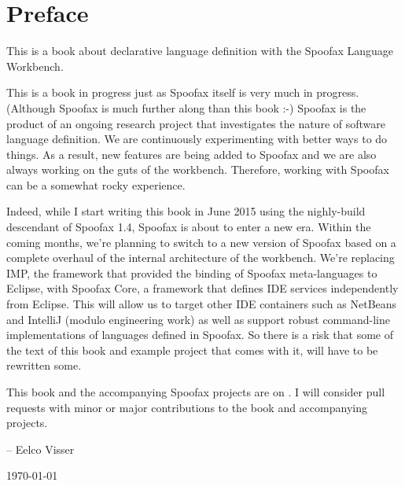\chapter*{Preface}

This is a book about declarative language definition with the Spoofax Language
Workbench.

This is a book in progress just as Spoofax itself is very much in progress.
(Although Spoofax is much further along than this book :-) Spoofax is the
product of an ongoing research project that investigates the nature of software
language definition. We are continuously experimenting with better ways to do
things.
As a result, new features are being added to Spoofax and we are also always
working on the guts of the workbench.
Therefore, working with Spoofax can be a somewhat rocky experience.

Indeed, while I start writing this book in June 2015 using the nighly-build
descendant of Spoofax 1.4, Spoofax is about to enter a new era.
Within the coming months, we're planning to switch to a new version of Spoofax
based on a complete overhaul of the internal architecture of the workbench.
We're replacing IMP, the framework that provided the binding of Spoofax
meta-languages to Eclipse, with Spoofax Core, a framework that defines IDE
services independently from Eclipse. This will allow us to target other IDE
containers such as NetBeans and IntelliJ (modulo engineering work) as well as
support robust command-line implementations of languages defined in Spoofax. So
there is a risk that some of the text of this book and example project that
comes with it, will have to be rewritten some.

This book and the accompanying Spoofax projects are on . 
I will consider pull requests with minor or major contributions to the book
and accompanying projects.

-- Eelco Visser

\today

